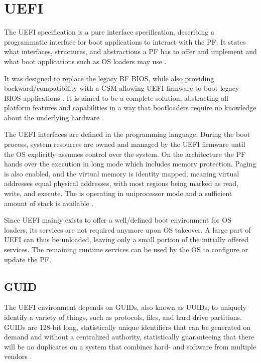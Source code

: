 
\section{\acf{UEFI}}

The \ac{UEFI} specification is a pure interface specification, describing a programmatic interface for boot applications to interact with the \ac{PF}.
It states what interfaces, structures, and abstractions a \ac{PF} has to offer and implement and what boot applications such as \ac{OS} loaders may use \cite{beyond-bios}.

It was designed to replace the legacy \acl{BF} \ac{BIOS}, while also providing backward\-/compatibility with a \acf{CSM} allowing \ac{UEFI} firmware to boot legacy \ac{BIOS} applications \cite{beyond-bios}.
It is aimed to be a complete solution, abstracting all platform features and capabilities in a way that bootloaders require no knowledge about the underlying hardware \cite[Section 1.3]{uefi-spec}.

The \ac{UEFI} interfaces are defined in the  programming language.
During the boot process, system resources are owned and managed by the \ac{UEFI} firmware until the \ac{OS} explicitly assumes control over the system.
On the   architecture the \ac{PF} hands over the execution in  long mode which includes memory protection.
Paging is also enabled, and the virtual memory is identity mapped, meaning virtual addresses equal physical addresses, with most regions being marked as read, write, and execute.
The  is operating in uniprocessor mode and a sufficient amount of stack is available \cite[Section 2.3.4]{uefi-spec}.

Since \ac{UEFI} mainly exists to offer a well\-/defined boot environment for \ac{OS} loaders, its services are not required anymore upon \ac{OS} takeover.
A large part of \ac{UEFI} can thus be unloaded, leaving only a small portion of the initially offered services.
The remaining runtime services can be used by the \ac{OS} to configure or update the \ac{PF}.

\subsection{\acf{GUID}}

The \ac{UEFI} environment depends on \acp{GUID}, also known as \acp{UUID}, to uniquely identify a variety of things, such as protocols, files, and hard drive partitions.
\acp{GUID} are 128-bit long, statistically unique identifiers that can be generated on demand and without a centralized authority, statistically guaranteeing that there will be no duplicates on a system that combines hard- and software from multiple vendors \cite{rfc-4122}.

